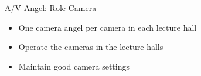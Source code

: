 
\begin{frame}{A/V Angel: Role Camera}
	\begin{itemize}
		\item One camera angel per camera in each lecture hall
		\item Operate the cameras in the lecture halls
		\item Maintain good camera settings
	\end{itemize}
\end{frame}

